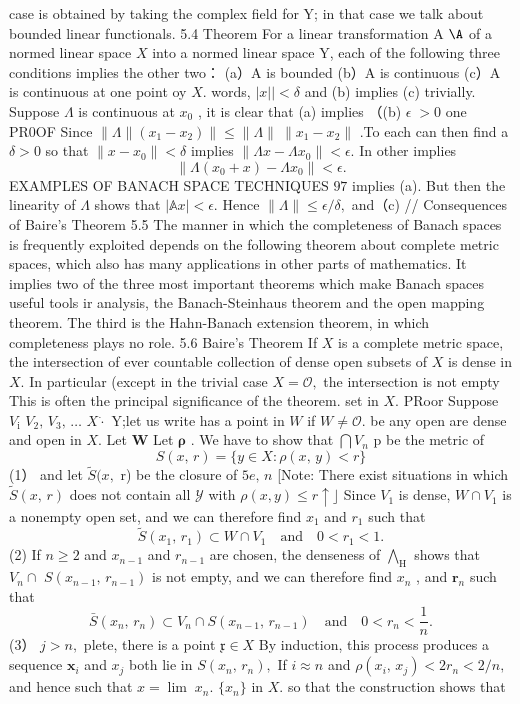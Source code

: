 case is obtained by taking the complex field for Y; in that case we talk about bounded linear functionals. 5.4 Theorem For a linear transformation A $\mathrm{\A}$ of a normed linear space $X$ into a normed linear space Y, each of the following three conditions implies the other two： (a）A is bounded (b）A is continuous (c）A is continuous at one point oy $X.$ words, $|x||<\delta$ and (b) implies (c) trivially. Suppose $\Lambda$ is continuous at $\scriptstyle x_{0}$ , it is clear that (a) implies （(b) $\scriptstyle\epsilon\;>0$ one PR0OF Since $\|\Lambda\|(x_{1}-x_{2})\|\leq\|\Lambda\|\ \|x_{1}-x_{2}\|$ .To each can then find a $\scriptstyle\delta>0$ so that $\|x-x_{0}\|<\delta$ implies $\|\Lambda x-\Lambda x_{0}\|<\epsilon.$ In other implies $$ \|\Lambda(x_{0}+x)-\Lambda x_{0}\|<\epsilon. $$EXAMPLES OF BANACH SPACE TECHNIQUES $97$ implies (a). But then the linearity of $\Lambda$ shows that $|\mathbb{A}x|<\epsilon.$ Hence $\|\Lambda\|\le\epsilon/\delta,$ and（c) // Consequences of Baire's Theorem 5.5 The manner in which the completeness of Banach spaces is frequently exploited depends on the following theorem about complete metric spaces, which also has many applications in other parts of mathematics. It implies two of the three most important theorems which make Banach spaces useful tools ir analysis, the Banach-Steinhaus theorem and the open mapping theorem. The third is the Hahn-Banach extension theorem, in which completeness plays no role. 5.6 Baire's Theorem If $X$ is a complete metric space, the intersection of ever countable collection of dense open subsets of $X$ is dense in $X.$ In particular (except in the trivial case $X={\mathcal{O}},$ the intersection is not empty This is often the principal significance of the theorem. set in $X.$ PRoor Suppose $V_{\mathrm{i}}$ $V_{2},\,V_{3},\,\ldots$ $X{\dot{\cdot}}$ Y;let us write has a point in $\textstyle W$ if $W\neq{\mathcal{O}}.$ be any open are dense and open in $X.$ Let ${\boldsymbol{W}}$ Let $\boldsymbol{\rho}$ . We have to show that $\bigcap{V_{n}}$ p be the metric of $$ S(x,\,r)=\{y\in X\colon\rho(x,\,y)<r\} $$ (1） and let ${\tilde{S}}(x,$ r) be the closure of $\scriptstyle5e,\,n$ [Note: There exist situations in which ${\tilde{S}}(x,\,r)$ does not contain all $\scriptstyle{\mathcal{Y}}$ with $\rho(x,y)\leq r\uparrow\rfloor$ Since ${\mathit{V}}_{1}$ is dense, $W\cap V_{1}$ is a nonempty open set, and we can therefore find $x_{1}$ and $r_{1}$ such that $$ \tilde{S}(x_{1},\,r_{1})\subset W\cap V_{1}\quad\mathrm{and}\quad0<r_{1}<1. $$ (2) If $\scriptstyle n\geq2$ and $x_{n-1}$ and $\textstyle r_{n-1}$ are chosen, the denseness of ${\textstyle\bigwedge}_{\mathrm{{H}}}$ shows that $V_{n}\cap$ $S(x_{n-1},\,r_{n-1})$ is not empty, and we can therefore find $\scriptstyle x_{n}$ , and ${\boldsymbol{r}}_{n}$ such that $$ \bar{S}(x_{n},\,r_{n})\subset{V_{n}}\cap{S(x_{n-1},\,r_{n-1})}\quad\mathrm{and}\quad0<r_{n}<\frac{1}{n}. $$ (3） $j>n,$ plete, there is a point ${\mathfrak{x}}\in X$ By induction, this process produces a sequence ${\boldsymbol{x}}_{i}$ and $x_{j}$ both lie in $S(x_{n},\,r_{n}),$ If $\scriptstyle{i\approx n}$ and $\rho(x_{i},\,x_{j})<2r_{n}<2/n,$ and hence such that $x=\operatorname*{lim}\;x_{n}.$ $\{x_{n}\}$ in $X.$ so that the construction shows that 